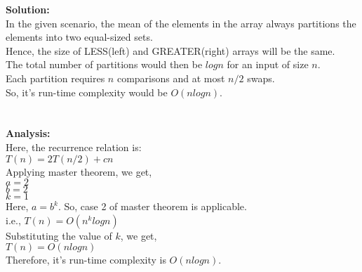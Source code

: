 \documentclass[12pt]{article}
\begin{document}
\begin{enumerate}
\begin{enumerate}
\textbf{Solution:}\\
In the given scenario, the mean of the elements in the array always partitions the elements into two equal-sized sets.\\
Hence, the size of LESS(left) and GREATER(right) arrays will be the same.\\
The total number of partitions would then be $log n$ for an input of size $n$.\\
Each partition requires $n$ comparisons and at most $n/2$ swaps. \\
So, it's run-time complexity would be $O(n log n)$.\\
\\
\\
\textbf{Analysis:}\\
Here, the recurrence relation is:\\
 $T(n) = 2T(n/2) + cn$\\
Applying master theorem, we get,\\
$a = 2$\\
$b = 2$\\
$k = 1$\\
Here, $a = b^k$. So, case 2 of master theorem is applicable.\\
i.e., $T(n) = O(n^k log n)$\\
Substituting the value of $k$, we get,\\
$T(n) = O(n log n)$\\
Therefore, it's run-time complexity is $O(n log n)$.\\


\end{enumerate}
\end{enumerate}
\end{document}
